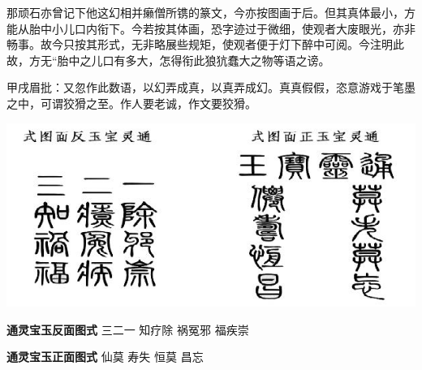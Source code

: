 \begin{parag}
    那顽石亦曾记下他这幻相并癞僧所镌的篆文，今亦按图画于后。但其真体最小，方能从胎中小儿口内衔下。今若按其体画，恐字迹过于微细，使观者大废眼光，亦非畅事。故今只按其形式，无非略展些规矩，使观者便于灯下醉中可阅。今注明此故，方无“胎中之儿口有多大，怎得衔此狼犺蠢大之物等语之谤。\begin{note}甲戌眉批：又忽作此数语，以幻弄成真，以真弄成幻。真真假假，恣意游戏于笔墨之中，可谓狡猾之至。作人要老诚，作文要狡猾。\end{note}
\end{parag}

\includegraphics{8-1}

\begin{parag}\textbf{通灵宝玉反面图式} \newline
    \indent 三二一\newline
    \indent 知疗除\newline
    \indent 祸冤邪\newline
    \indent 福疾崇\newline
\end{parag}


\begin{parag}
    \textbf{通灵宝玉正面图式}\newline
    \indent 仙莫\newline
    \indent 寿失\newline
    \indent 恒莫\newline
    \indent 昌忘\newline
\end{parag}


